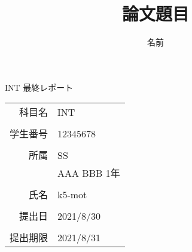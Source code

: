 \documentclass[11pt,a4paper]{jsarticle}
\title{論文題目}
\author{名前}
\begin{document}
\begin{titlepage}
  \begin{center}
  \vspace*{90pt}
  {\Huge INT 最終レポート}
  \vspace{250pt} \\
  \begin{tabular}{rl}
    {\LARGE 科目名} & {\LARGE INT}\\ \\
    {\LARGE 学生番号} & {\LARGE 12345678}\\ \\
    {\LARGE 所属} & {\LARGE SS}\\
                 & {\LARGE AAA BBB 1年}\\ \\
    {\LARGE 氏名} & {\LARGE k5-mot}\\ \\
    {\LARGE 提出日} & {\LARGE 2021/8/30}\\ \\
    {\LARGE 提出期限} & {\LARGE 2021/8/31}\\
  \end{tabular} \vspace{3pt} \\
  \end{center}
\end{titlepage}
\newpage
%
\tableofcontents
\listoffigures
\listoftables
\lstlistoflistings
%


%


%
%
\end{document}
